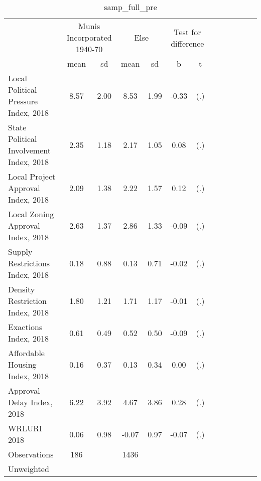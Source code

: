 \begin{table}[htbp]\centering
\def\sym#1{\ifmmode^{#1}\else\(^{#1}\)\fi}
\caption{samp\_full\_pre \label{tab1}}
\begin{tabular}{l*{3}{cccc}}
\toprule
                    &\multicolumn{2}{c}{Munis Incorporated 1940-70}&\multicolumn{2}{c}{Else} &\multicolumn{2}{c}{Test for difference}\\
                    &        mean&          sd&        mean&          sd&           b         &           t\\
\midrule
Local Political Pressure Index, 2018&        8.57&        2.00&        8.53&        1.99&       -0.33         &         (.)\\
State Political Involvement Index, 2018&        2.35&        1.18&        2.17&        1.05&        0.08         &         (.)\\
Local Project Approval Index, 2018&        2.09&        1.38&        2.22&        1.57&        0.12         &         (.)\\
Local Zoning Approval Index, 2018&        2.63&        1.37&        2.86&        1.33&       -0.09         &         (.)\\
Supply Restrictions Index, 2018&        0.18&        0.88&        0.13&        0.71&       -0.02         &         (.)\\
Density Restriction Index, 2018&        1.80&        1.21&        1.71&        1.17&       -0.01         &         (.)\\
Exactions Index, 2018&        0.61&        0.49&        0.52&        0.50&       -0.09         &         (.)\\
Affordable Housing Index, 2018&        0.16&        0.37&        0.13&        0.34&        0.00         &         (.)\\
Approval Delay Index, 2018&        6.22&        3.92&        4.67&        3.86&        0.28         &         (.)\\
WRLURI 2018         &        0.06&        0.98&       -0.07&        0.97&       -0.07         &         (.)\\
\midrule
Observations        &         186&            &        1436&            &                     &            \\
\bottomrule
\multicolumn{7}{l}{\footnotesize Unweighted}\\
\end{tabular}
\end{table}
